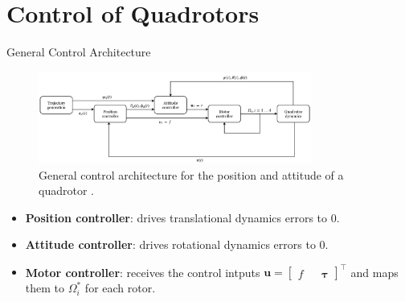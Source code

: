 \documentclass{thesisbeamer}
\begin{document}


\section{Control of Quadrotors}

\begin{frame}[t]{General Control Architecture} \vspace{4pt}
 \begin{figure}[h]
 \centering
 \includegraphics[width=0.8\textwidth]{Images/Control/General_control_architecture}
 \caption{General control architecture for the position and attitude of a quadrotor \cite{Faessler2018}.}
 \end{figure}
 
\begin{itemize}[<+->]
	\item \textbf{Position controller}: drives translational dynamics errors to 0.
	\item \textbf{Attitude controller}: drives rotational dynamics errors to 0.
	\item \textbf{Motor controller}: receives the control intputs $\bm{u}=\begin{bmatrix}
	f && \bm{\tau}
	\end{bmatrix}^{\intercal}
	$ and maps them to $\Omega_i^*$ for each rotor. %
\end{itemize} 
\end{frame}
\end{document}
